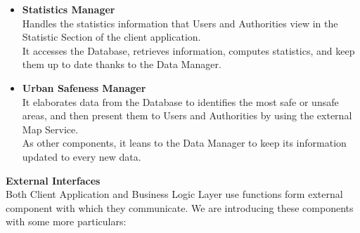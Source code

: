 \begin{itemize}
     \item\textbf{Statistics Manager}\\
     Handles the statistics information that Users and Authorities view in the Statistic Section of the client application.\\
     It accesses the Database, retrieves information, computes statistics, and keep them up to date thanks to the Data Manager.
     
     \item\textbf{Urban Safeness Manager}\\
     It elaborates data from the Database to identifies the most safe or unsafe areas, and then present them to Users and Authorities by using the external Map Service.\\
     As other components, it leans to the Data Manager to keep its information updated to every new data.
     
\end{itemize}

\noindent\textbf{External Interfaces}\\
Both Client Application and Business Logic Layer use functions form external component with which they communicate. We are introducing these components with some more particulars:

